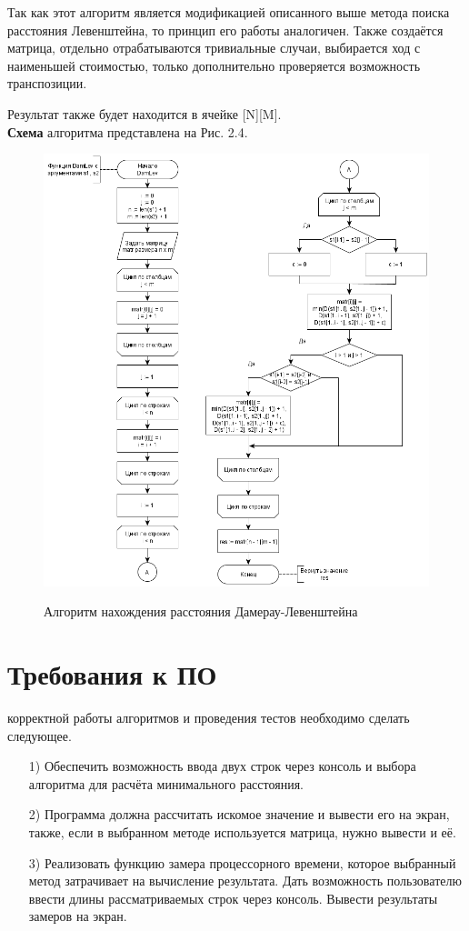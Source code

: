 \documentclass[12pt]{report}
\begin{document}
Так как этот алгоритм является модификацией описанного выше метода поиска расстояния Левенштейна, то принцип его работы аналогичен. Также создаётся матрица, отдельно отрабатываются тривиальные случаи, выбирается ход с наименьшей стоимостью, только дополнительно проверяется возможность транспозиции.

Результат также будет находится в ячейке [N][M].\\

\textbf{Схема} алгоритма представлена на Рис. 2.4.

\begin{figure}[h]
	\begin{center}
		{\includegraphics[scale = 0.63]{DanLev}}
		\caption{Алгоритм нахождения расстояния Дамерау-Левенштейна}
	\end{center}
\end{figure}

\section{Требования к ПО}
 корректной работы алгоритмов и проведения тестов необходимо сделать следующее.
\begin{enumerate}
	\item[1)]Обеспечить возможность ввода двух строк через консоль и выбора алгоритма для расчёта минимального расстояния.
	\item[2)]Программа должна рассчитать искомое значение и вывести его на экран, также, если в выбранном методе используется матрица, нужно вывести и её.
	\item[3)]Реализовать функцию замера процессорного времени, которое выбранный метод затрачивает на вычисление результата. Дать возможность пользователю ввести длины рассматриваемых строк через консоль. Вывести результаты замеров на экран.
	\end{enumerate}
\end{document}
